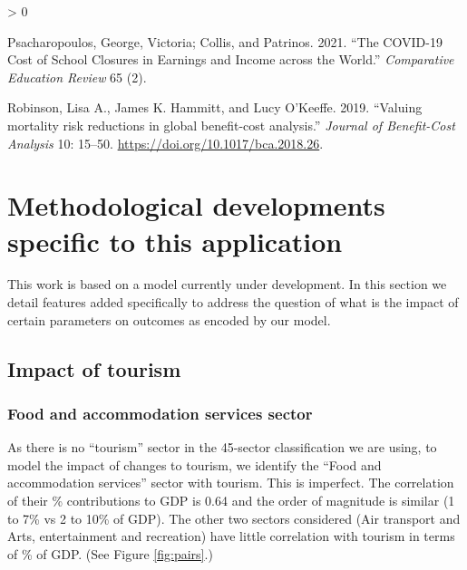 \documentclass[
]{article}
\newlength{\cslhangindent}
\newenvironment{CSLReferences}[2] %
 {%
  \setlength{\parindent}{0pt}
  \ifodd #1 \everypar{\setlength{\hangindent}{\cslhangindent}}\ignorespaces\fi
  \ifnum #2 > 0
  \setlength{\parskip}{#2\baselineskip}
  \fi
 }%
 {}
\begin{document}
\begin{CSLReferences}{1}{0}
\leavevmode\hypertarget{ref-Psacharopoulos2021a}{}%
Psacharopoulos, George, Victoria; Collis, and Patrinos. 2021. {``{The COVID-19 Cost of School Closures in Earnings and Income across the World}.''} \emph{Comparative Education Review} 65 (2).

\leavevmode\hypertarget{ref-Robinson2019}{}%
Robinson, Lisa A., James K. Hammitt, and Lucy O'Keeffe. 2019. {``{Valuing mortality risk reductions in global benefit-cost analysis}.''} \emph{Journal of Benefit-Cost Analysis} 10: 15--50. \url{https://doi.org/10.1017/bca.2018.26}.

\end{CSLReferences}

\newpage

\hypertarget{methodological-developments-specific-to-this-application}{%
\section{Methodological developments specific to this application}\label{methodological-developments-specific-to-this-application}}

This work is based on a model currently under development. In this section we detail features added specifically to address the question of what is the impact of certain parameters on outcomes as encoded by our model.

\hypertarget{impact-of-tourism}{%
\subsection{Impact of tourism}\label{impact-of-tourism}}

\hypertarget{food-and-accommodation-services-sector}{%
\subsubsection{Food and accommodation services sector}\label{food-and-accommodation-services-sector}}

As there is no ``tourism'' sector in the 45-sector classification we are using, to model the impact of changes to tourism, we identify the ``Food and accommodation services'' sector with tourism. This is imperfect. The correlation of their \% contributions to GDP is 0.64 and the order of magnitude is similar (1 to 7\% vs 2 to 10\% of GDP). The other two sectors considered (Air transport and Arts, entertainment and recreation) have little correlation with tourism in terms of \% of GDP. (See Figure \ref{fig:pairs}.)
\end{document}

